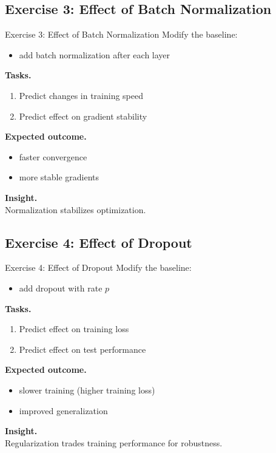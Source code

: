 \documentclass[aspectratio=169,11pt]{beamer}
\begin{document}
\subsection{Exercise 3: Effect of Batch Normalization}
\begin{frame}[t,allowframebreaks]{Exercise 3: Effect of Batch Normalization}
\small
Modify the baseline:

\begin{itemize}
    \item add batch normalization after each layer
\end{itemize}

\textbf{Tasks.}\\ \begin{enumerate}
    \item Predict changes in training speed
    \item Predict effect on gradient stability
\end{enumerate}

\textbf{Expected outcome.}\\ \begin{itemize}
    \item faster convergence
    \item more stable gradients
\end{itemize}

\textbf{Insight.}\\ Normalization stabilizes optimization.
\end{frame}

\subsection{Exercise 4: Effect of Dropout}
\begin{frame}[t,allowframebreaks]{Exercise 4: Effect of Dropout}
\small
Modify the baseline:

\begin{itemize}
    \item add dropout with rate $p$
\end{itemize}

\textbf{Tasks.}\\ \begin{enumerate}
    \item Predict effect on training loss
    \item Predict effect on test performance
\end{enumerate}

\textbf{Expected outcome.}\\ \begin{itemize}
    \item slower training (higher training loss)
    \item improved generalization
\end{itemize}

\textbf{Insight.}\\ Regularization trades training performance for robustness.
\end{frame}
\end{document}
